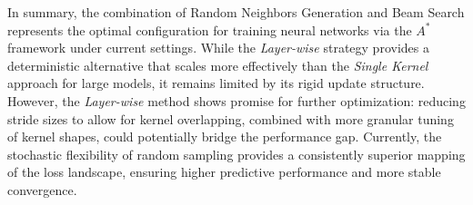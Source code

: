 In summary, the combination of Random Neighbors Generation and Beam Search represents the optimal configuration for training neural networks via the $A^*$ framework under current settings. While the \textit{Layer-wise} strategy provides a deterministic alternative that scales more effectively than the \textit{Single Kernel} approach for large models, it remains limited by its rigid update structure. However, the \textit{Layer-wise} method shows promise for further optimization: reducing stride sizes to allow for kernel overlapping, combined with more granular tuning of kernel shapes, could potentially bridge the performance gap. Currently, the stochastic flexibility of random sampling provides a consistently superior mapping of the loss landscape, ensuring higher predictive performance and more stable convergence.